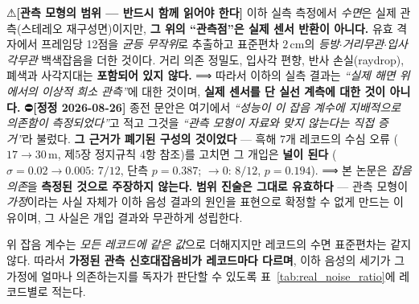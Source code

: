 \documentclass[11pt]{report}
\numberwithin{equation}{chapter}
\numberwithin{figure}{chapter}
\numberwithin{table}{chapter}
\begin{document}
⚠\textbf{[관측 모형의 범위 --- 반드시 함께 읽어야 한다]} 이하 실측 측정에서 \emph{수면}은
실제 관측(스테레오 재구성면)이지만, \textbf{그 위의 ``관측점''은 실제 센서 반환이 아니다.}
유효 격자에서 프레임당 12점을 \emph{균등 무작위}로 추출하고 표준편차 $2$\,cm의
\emph{등방$\cdot$거리무관$\cdot$입사각무관} 백색잡음을 더한 것이다. 거리 의존 정밀도,
입사각 편향, 반사 손실(raydrop), 폐색과 사각지대는 \textbf{포함되어 있지 않다.}
⟹ 따라서 이하의 실측 결과는 \emph{``실제 해면 위에서의 이상적 희소 관측''}에 대한 것이며,
\textbf{실제 센서를 단 실선 계측에 대한 것이 아니다.}
⛔\textbf{[정정 2026-08-26]} 종전 문안은 여기에서 \emph{``성능이 이 잡음 계수에 지배적으로
의존함이 측정되었다''}고 적고 그것을 \emph{``관측 모형이 자료와 맞지 않는다는 직접 증거''}라
불렀다. \textbf{그 근거가 폐기된 구성의 것이었다} --- 흑해 $7$개 레코드의 수심 오류
($17 \to 30$\,m, 제5장 정지규칙 4항 참조)를 고치면 그 개입은 \textbf{널이 된다}
($\sigma = 0.02 \to 0.005$: $7/12$, 단측 $p = 0.387$; $\to 0$: $8/12$, $p = 0.194$).
⟹ 본 논문은 \emph{잡음 의존}을 \textbf{측정된 것으로 주장하지 않는다.}
\textbf{범위 진술은 그대로 유효하다} --- 관측 모형이 \emph{가정}이라는 사실 자체가
이하 음성 결과의 원인을 표현으로 확정할 수 없게 만드는 이유이며, 그 사실은 개입 결과와
무관하게 성립한다.

위 잡음 계수는 \emph{모든 레코드에 같은 값}으로 더해지지만 레코드의 수면 표준편차는
같지 않다. 따라서 \textbf{가정된 관측 신호대잡음비가 레코드마다 다르며}, 이하 음성의 세기가
그 가정에 얼마나 의존하는지를 독자가 판단할 수 있도록 표~\ref{tab:real_noise_ratio}에
레코드별로 적는다.
\end{document}
